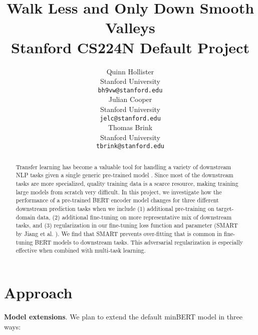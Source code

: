 \documentclass{article}
\title{
  Walk Less and Only Down Smooth Valleys \\
  \vspace{0.15cm}
  \small{\normalfont Stanford CS224N Default Project}  %
}
\author{
  Quinn Hollister \\
  Stanford University \\
  \texttt{bh9vw@stanford.edu} \\
   \And
    Julian Cooper \\
  Stanford University \\
  \texttt{jelc@stanford.edu} \\
   \And
   Thomas Brink \\
  Stanford University \\
  \texttt{tbrink@stanford.edu} \\
}
\begin{document}
\maketitle

\begin{abstract}
  Transfer learning has become a valuable tool for handling a variety of downstream NLP tasks given a single generic pre-trained model \cite{weiss2016survey}. Since most of the downstream tasks are more specialized, quality training data is a scarce resource, making training large models from scratch very difficult. 
  In this project, we investigate how the performance of a pre-trained BERT encoder model changes for three different downstream prediction tasks when we include (1) additional pre-training on target-domain data, (2) additional fine-tuning on more representative mix of downstream tasks, and (3) regularization in our fine-tuning loss function and parameter (SMART by Jiang et al. \cite{smart}). 
  We find that SMART prevents over-fitting that is common in fine-tuning BERT models to downstream tasks. This adversarial regularization is especially effective when combined with multi-task learning. 
  
\end{abstract}


\section{Approach}

\textbf{Model extensions}. We plan to extend the default minBERT model in three ways:
\end{document}
